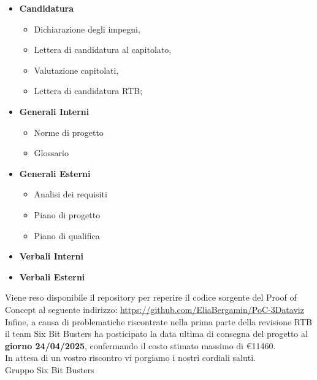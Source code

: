 \begin{titlepage}
        \begin{itemize}
                \item \textbf{Candidatura}
                \begin{itemize}
                        \item Dichiarazione degli impegni,
                        \item Lettera di candidatura al capitolato,
                        \item Valutazione capitolati,
                        \item Lettera di candidatura RTB;
                \end{itemize}
                \item \textbf{Generali Interni}
                \begin{itemize}
                        \item Norme di progetto
                        \item Glossario
                \end{itemize}
                \item \textbf{Generali Esterni}
                \begin{itemize}
                        \item Analisi dei requisiti
                        \item Piano di progetto
                        \item Piano di qualifica
                \end{itemize}
                \item \textbf{Verbali Interni}
                \item \textbf{Verbali Esterni}
        \end{itemize}

        Viene reso disponibile il repository per reperire il codice sorgente del Proof of Concept al seguente indirizzo: 
        \url{https://github.com/EliaBergamin/PoC-3Dataviz}\\

        Infine, a causa di problematiche riscontrate nella prima parte della revisione RTB il team Six Bit Busters ha posticipato la data ultima di consegna del progetto al \textbf{giorno 24/04/2025}, confermando il costo
        stimato massimo di \euro{11460}.\\
	
	In attesa di un vostro riscontro vi porgiamo i nostri cordiali saluti.\\
        Gruppo Six Bit Busters
	
\end{titlepage}
